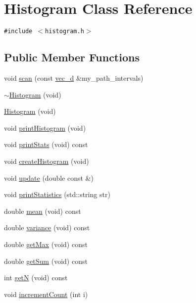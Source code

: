 \hypertarget{classHistogram}{
\section{Histogram Class Reference}
\label{classHistogram}
}
{\tt \#include $<$histogram.h$>$}

\subsection*{Public Member Functions}
\begin{CompactItemize}
\item 
void \hyperlink{classHistogram_86dc8ad1a5ecf10e7e2cb3376534637a}{scan} (const \hyperlink{histogram_8h_db0ab3db1ab685e2d2bff657e3e86861}{vec\_\-d} \&my\_\-path\_\-intervals)
\item 
\hyperlink{classHistogram_6be99bbd12f2dfe12c38739166f37db2}{$\sim$Histogram} (void)
\item 
\hyperlink{classHistogram_f7f6bdea94a9e6a44ca389d2a0f2cae2}{Histogram} (void)
\item 
void \hyperlink{classHistogram_e0d8f995fb46dcfd7bbf39bd5aa0674d}{printHistogram} (void)
\item 
void \hyperlink{classHistogram_53093234bfd4877f2485e093dbbe65e5}{printStats} (void) const 
\item 
void \hyperlink{classHistogram_022e55f20128c0dc5c8108d6d10054e9}{createHistogram} (void)
\item 
void \hyperlink{classHistogram_56a9572fc514f021a4867887e8fff9de}{update} (double const \&)
\item 
void \hyperlink{classHistogram_7bb79b6a488124f1e4128390541ef126}{printStatistics} (std::string str)
\item 
double \hyperlink{classHistogram_2ac97cb3e642dee7fa5a9d7bb2d1e451}{mean} (void) const 
\item 
double \hyperlink{classHistogram_7e1d2c7680730e9536f5496e8c0bacaa}{variance} (void) const 
\item 
double \hyperlink{classHistogram_3ca1a2615022ea79e5416e9f0b0cf3ff}{getMax} (void) const 
\item 
double \hyperlink{classHistogram_751589c1e984897e7bacccbc86f04e13}{getSum} (void) const 
\item 
int \hyperlink{classHistogram_e9bdc4c640381ca1babc8005b1a4005b}{getN} (void) const 
\item 
void \hyperlink{classHistogram_b09f206e1a16868d2d689853d2bd1209}{incrementCount} (int i)
\end{CompactItemize}


